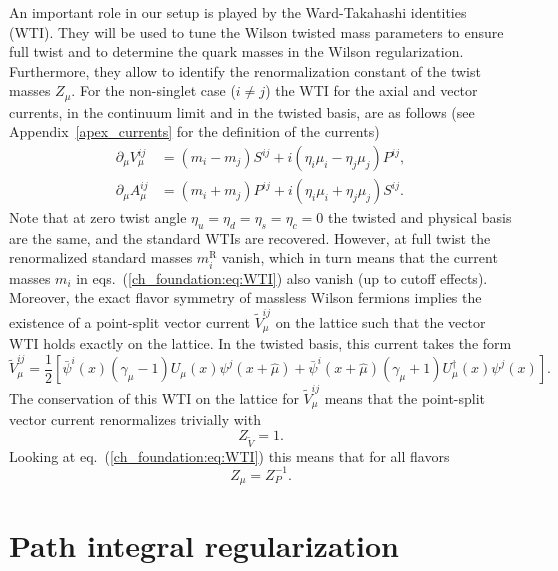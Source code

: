An important role in our setup is played by the Ward-Takahashi identities (WTI). They will be used to tune the Wilson twisted mass parameters to ensure full twist and to determine the quark masses in the Wilson regularization. Furthermore, they allow to identify the renormalization constant of the twist masses $Z_{\mu}$. For the non-singlet case ($i\neq j$) the WTI for the axial and vector currents, in the continuum limit and in the twisted basis, are as follows (see Appendix~\ref{apex_currents} for the definition of the currents)
\begin{align}
\label{ch_foundation:eq:WTI}
\partial_{\mu}V_{\mu}^{ij}&=(m_i-m_j)S^{ij}+i(\eta_i\mu_i-\eta_j\mu_j)P^{ij},\\
\partial_{\mu}A_{\mu}^{ij}&=(m_i+m_j)P^{ij}+i(\eta_i\mu_i+\eta_j\mu_j)S^{ij}.
\end{align}
Note that at zero twist angle $\eta_u=\eta_d=\eta_s=\eta_c=0$ the twisted and physical basis are the same, and the standard WTIs are recovered. However, at full twist the renormalized standard masses $m_i^{\textrm{R}}$ vanish, which in turn means that the current masses $m_{i}$ in eqs.~(\ref{ch_foundation:eq:WTI}) also vanish (up to cutoff effects). Moreover, the exact flavor symmetry of massless Wilson fermions implies the existence of a point-split vector current $\tilde{V}_{\mu}^{ij}$ on the lattice such that the vector WTI holds exactly on the lattice. In the twisted basis, this current takes the form
\begin{equation}
\tilde{V}_{\mu}^{ij}=\frac{1}{2}\left[\bar{\psi}^i(x)(\gamma_{\mu}-1)U_{\mu}(x)\psi^j(x+\hat{\mu})+\bar{\psi}^i(x+\hat{\mu})(\gamma_{\mu}+1)U_{\mu}^{\dagger}(x)\psi^j(x)\right].
\end{equation}
The conservation of this WTI on the lattice for $\tilde{V}_{\mu}^{ij}$ means that the point-split vector current renormalizes trivially with
\begin{equation}
\label{ch_foundation:eq:ZV=1}
Z_{\tilde{V}}=1.
\end{equation}
Looking at eq.~(\ref{ch_foundation:eq:WTI}) this means that for all flavors
\begin{equation}
\label{ch_foundation:eq:Zmu}
Z_{\mu}=Z_P^{-1}.
\end{equation}



\section{Path integral regularization}
\label{ch_foundation:sec:path}

